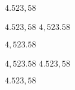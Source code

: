 \documentclass[english,ngerman]{tudscrartcl}%
\begin{document}
\mathswapoff
\(4.523,58\)
\mathswapon

\(4.523,58\)
\(4,523.58\)

\begingroup
  \commaswap{\,}
  \dotswap{,}
  \(4,523.58\)
\endgroup

\begingroup
  \(4,523.58\)\newline
  \(4.523,58\)
\endgroup

\begingroup
  \dotswap{\,}
  \(4.523,58\)
\endgroup
\end{document}
